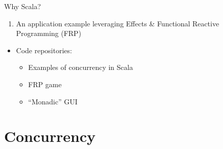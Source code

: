 \documentclass[presentation, 9pt]{beamer}\mode<presentation>{\usetheme{AMSBolognaFC}}
\begin{document}
\begin{frame}{Why Scala?}
\begin{itemize}
\begin{enumerate}
      \item An application example leveraging Effects \& Functional Reactive Programming (FRP)
		\end{enumerate}
	\end{itemize}
	\begin{itemize}
		\item Code repositories:
		\begin{itemize}
			\item Examples of concurrency in Scala \href{https://github.com/cric96/scala-concurrent-programming}{\faLink}
   		\item FRP game \href{https://github.com/cric96/scala-frp-gui}{\faLink}
     	\item ``Monadic'' GUI \href{https://github.com/cric96/scala-functional-gui}{\faLink}  
		\end{itemize}
	\end{itemize}
 \end{frame}
\section{Concurrency}
\end{document}
